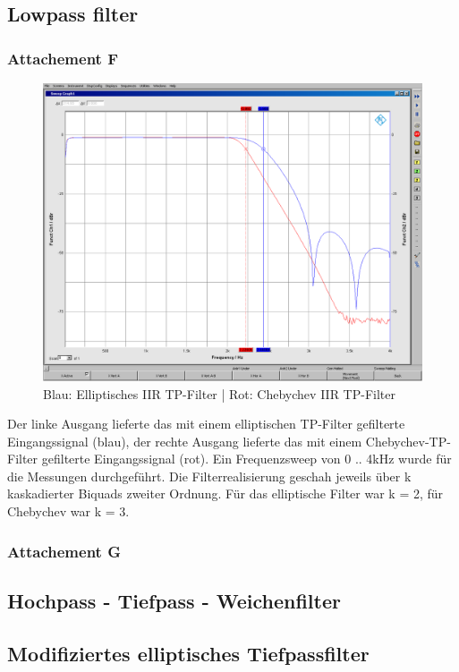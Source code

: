 \subsection{Lowpass filter}
\subsubsection{Attachement F}

	\begin{figure}[h]
		\centering
		\includegraphics[width=0.8\linewidth]{Bilder/EllipCheby}
		\caption{Blau: Elliptisches IIR TP-Filter | Rot: Chebychev IIR TP-Filter}
		\label{fig:EllipCheby}
	\end{figure}
	
\noindent Der linke Ausgang lieferte das mit einem elliptischen TP-Filter gefilterte Eingangssignal (blau), der rechte Ausgang lieferte das mit einem Chebychev-TP-Filter gefilterte Eingangssignal (rot). Ein Frequenzsweep von 0 .. 4kHz wurde für die Messungen durchgeführt. Die Filterrealisierung geschah jeweils über k kaskadierter Biquads zweiter Ordnung. Für das elliptische Filter war k = 2, für Chebychev war k = 3.

\subsubsection{Attachement G}


\clearpage

\subsection{Hochpass - Tiefpass - Weichenfilter}


\subsection{Modifiziertes elliptisches Tiefpassfilter}

